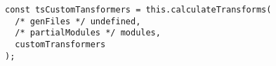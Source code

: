 \begin{verbatim}
const tsCustomTansformers = this.calculateTransforms(
  /* genFiles */ undefined,
  /* partialModules */ modules,
  customTransformers
);
\end{verbatim}
